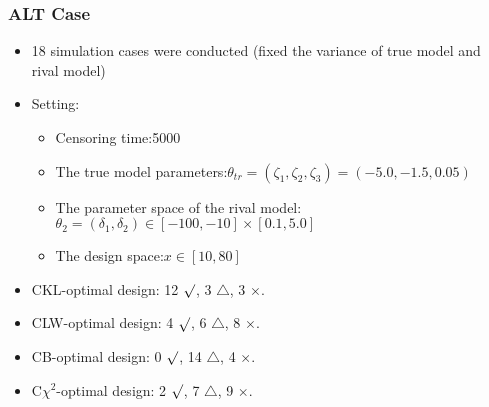 \documentclass[xcolor=dvipsnames,aspectratio=1610]{beamer}
\begin{document}
\begin{frame}
\frametitle{ALT Case}
\begin{itemize}
\item 18 simulation cases were conducted (fixed the variance of true model and rival model)
\item Setting:
\begin{itemize}
\item Censoring time:5000
\item The true model parameters:$\theta_{tr} = (\zeta_1, \zeta_2, \zeta_3) = (-5.0, -1.5, 0.05)$
\item The parameter space of the rival model:$\theta_2 = (\delta_1, \delta_2) \in [-100, -10] \times [0.1, 5.0]$
\item The design space:$x \in [10, 80]$
\end{itemize}
\item CKL-optimal design: 12 $\surd$, 3 $\triangle$, 3 $\times$.
\item CLW-optimal design: 4 $\surd$, 6 $\triangle$, 8 $\times$.
\item CB-optimal design: 0 $\surd$, 14 $\triangle$, 4 $\times$.
\item C$\chi^2$-optimal design: 2 $\surd$, 7 $\triangle$, 9 $\times$.

\end{itemize}

\end{frame}

\end{document}
